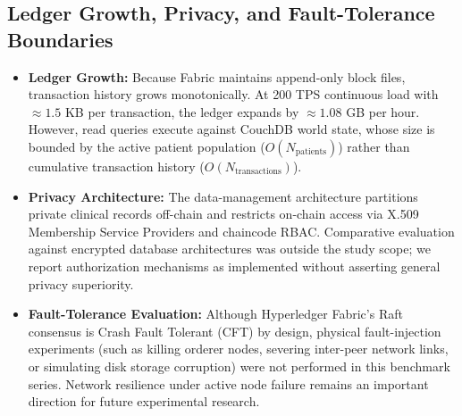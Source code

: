\documentclass[runningheads]{llncs}
\begin{document}
\subsection{Ledger Growth, Privacy, and Fault-Tolerance Boundaries}
\begin{itemize}
    \item \textbf{Ledger Growth:} Because Fabric maintains append-only block files, transaction history grows monotonically. At 200 TPS continuous load with $\approx 1.5$ KB per transaction, the ledger expands by $\approx 1.08$ GB per hour. However, read queries execute against CouchDB world state, whose size is bounded by the active patient population ($O(N_{\text{patients}})$) rather than cumulative transaction history ($O(N_{\text{transactions}})$).
    \item \textbf{Privacy Architecture:} The data-management architecture partitions private clinical records off-chain and restricts on-chain access via X.509 Membership Service Providers and chaincode RBAC. Comparative evaluation against encrypted database architectures was outside the study scope; we report authorization mechanisms as implemented without asserting general privacy superiority.
    \item \textbf{Fault-Tolerance Evaluation:} Although Hyperledger Fabric's Raft consensus is Crash Fault Tolerant (CFT) by design, physical fault-injection experiments (such as killing orderer nodes, severing inter-peer network links, or simulating disk storage corruption) were not performed in this benchmark series. Network resilience under active node failure remains an important direction for future experimental research.
\end{itemize}

\end{document}

